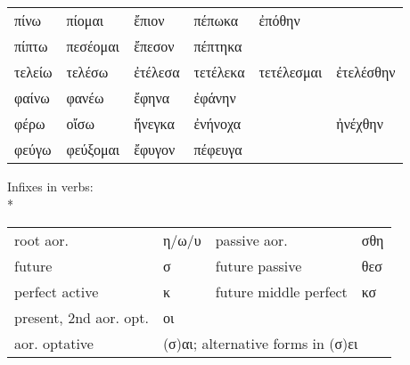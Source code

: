 \begin{small}
{\begin{tabular}{llllll}
πίνω  &  πίομαι  &  ἔπιον  &  πέπωκα  &  ἐπόθην        \\
πίπτω  &  πεσέομαι  &  ἔπεσον  &  πέπτηκα        \\
τελείω  &  τελέσω  &  ἐτέλεσα  &  τετέλεκα  &  τετέλεσμαι  &  ἐτελέσθην        \\
φαίνω  &  φανέω  &  ἔφηνα  &  ἐφάνην        \\
φέρω  &  οἴσω  &  ἤνεγκα  &  ἐνήνοχα  &    &  ἠνέχθην        \\
φεύγω  &  φεύξομαι  &  ἔφυγον  &  πέφευγα        \\
\end{tabular}

}

\end{small}

\pagebreak

Infixes in verbs:\\*
%
\begin{tabular}{llll}
root aor.         & η/ω/υ & passive aor.      & σθη \\
future              & σ     & future passive      & θεσ \\
perfect active      & κ     & future middle perfect & κσ \\
present, 2nd aor. opt.    & οι \\
aor. optative     & \multicolumn{3}{l}{(σ)αι; alternative forms in (σ)ει}\\
\end{tabular}

